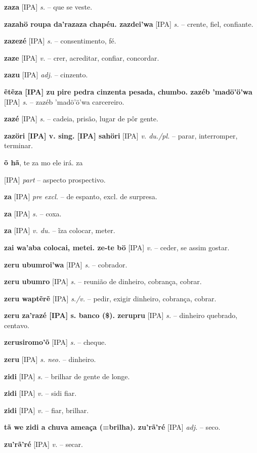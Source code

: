 {{{{{\textbf{zaza} [IPA] \textit{s.} -- que se veste.

\textbf{zazahö roupa  da'razaza chapéu. zazdei'wa} [IPA] \textit{s.} -- crente, fiel, confiante.

\textbf{zazezé} [IPA] \textit{s.} -- consentimento, fé.

\textbf{zaze} [IPA] \textit{v.} -- crer, acreditar, confiar, concordar.

\textbf{zazu} [IPA] \textit{adj.} -- cinzento.

\textbf{ẽtẽza [IPA] zu pire pedra cinzenta pesada, chumbo. zazéb 'madö'ö'wa} [IPA] \textit{s.} -- zazéb 'madö'ö'wa carcereiro.

\textbf{zazé} [IPA] \textit{s.} -- cadeia, prisão, lugar de pôr gente.

\textbf{zazöri [IPA] v. sing. [IPA] sahöri} [IPA] \textit{v. du./pl.} -- parar, interromper, terminar.

\textbf{õ hã}, te za mo ele irá. za} [IPA] \textit{part} -- {aspecto prospectivo}.

\textbf{za} [IPA] \textit{pre excl.} -- de espanto, excl. de surpresa.

\textbf{za} [IPA] \textit{s.} -- coxa.

\textbf{za} [IPA] \textit{v. du.} -- ĩza colocar, meter.

\textbf{zai wa'aba colocai, metei. ze-te bö} [IPA] \textit{v.} -- ceder, se assim gostar.

\textbf{zeru ubumroi'wa} [IPA] \textit{s.} -- cobrador.

\textbf{zeru ubumro} [IPA] \textit{s.} -- reunião de dinheiro, cobrança, cobrar.

\textbf{zeru waptẽrẽ} [IPA] \textit{s./v.} -- pedir, exigir dinheiro, cobrança, cobrar.

\textbf{zeru za'razé [IPA] s. banco (\$). zerupru} [IPA] \textit{s.} -- dinheiro quebrado, centavo.

\textbf{zerusiromo'õ} [IPA] \textit{s.} -- cheque.

\textbf{zeru} [IPA] \textit{s. neo.} -- dinheiro.

\textbf{zidi} [IPA] \textit{s.} -- brilhar de gente de longe.

\textbf{zidi} [IPA] \textit{v.} -- sidi fiar.

\textbf{zidi} [IPA] \textit{v.} -- fiar, brilhar.

\textbf{tã we zidi a chuva ameaça (=brilha). zu'rã'ré} [IPA] \textit{adj.} -- seco.

\textbf{zu'rã'ré} [IPA] \textit{v.} -- secar.

}}}}
